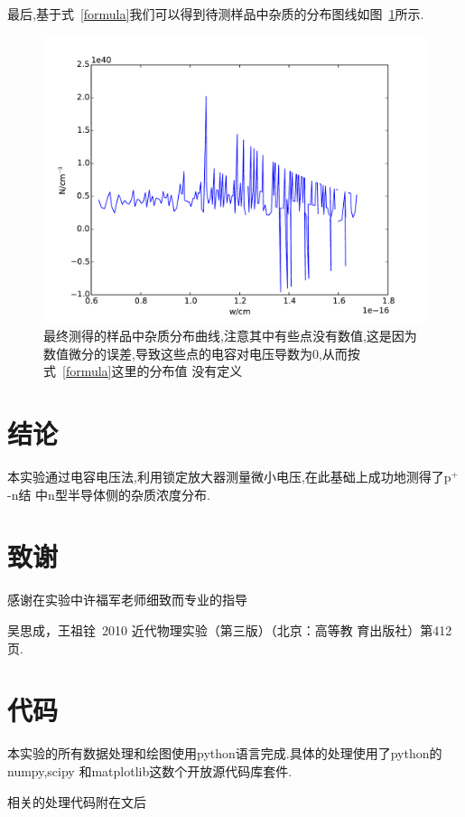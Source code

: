 \documentclass[aps,pre,12pt,preprint,onecolumn,showpacs,showkeys]{revtex4-1}
\begin{document}
最后,基于式~\ref{formula}我们可以得到待测样品中杂质的分布图线如图~\ref{Nw}所示.


\begin{figure}
\begin{center}
    \includegraphics[width=\textwidth]{Nw.pdf}
\end{center}
\caption{\label{Nw}最终测得的样品中杂质分布曲线,注意其中有些点没有数值,这是因为
数值微分的误差,导致这些点的电容对电压导数为0,从而按式~\ref{formula}这里的分布值
没有定义}
\end{figure}



\section{结论}

本实验通过电容电压法,利用锁定放大器测量微小电压,在此基础上成功地测得了p$^+$-n结
中n型半导体侧的杂质浓度分布.

\section{致谢}

感谢在实验中许福军老师细致而专业的指导


\begin{thebibliography}{}
 吴思成，王祖铨~2010 近代物理实验（第三版）（北京：高等教
育出版社）第412页.  %
\end{thebibliography}

\clearpage
\appendix

\section{代码}

本实验的所有数据处理和绘图使用python语言完成.具体的处理使用了python的numpy,scipy
和matplotlib这数个开放源代码库套件.

相关的处理代码附在文后






\end{document}
